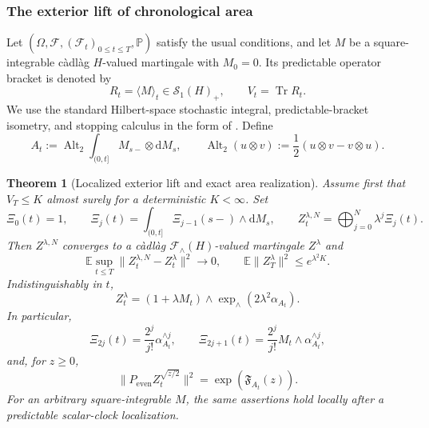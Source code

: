 \documentclass[10pt,reqno]{amsart}
\theoremstyle{plain}
\newtheorem{theorem}{Theorem}[section]
\theoremstyle{definition}
\theoremstyle{remark}
\begin{document}
\subsubsection{The exterior lift of chronological area}

Let \((\Omega,\mathcal F,(\mathcal F_t)_{0\leq t\leq T},\mathbb P)\)
satisfy the usual conditions, and let \(M\) be a square-integrable
c\`adl\`ag \(H\)-valued martingale with \(M_0=0\).  Its predictable
operator bracket is denoted by
\[
 R_t=\langle M\rangle_t\in\mathcal S_1(H)_+,
 \qquad V_t=\operatorname{Tr}R_t.
\]
We use the standard Hilbert-space stochastic integral, predictable-bracket
isometry, and stopping calculus in the form of
\cite{MetivierPellaumail80}.
Define
\begin{equation}
 A_t:=\operatorname{Alt}_2
       \int_{(0,t]}M_{s-}\otimes\mathrm dM_s,
 \qquad
 \operatorname{Alt}_2(u\otimes v)
 :=\frac12(u\otimes v-v\otimes u).
 \label{cc:eq-chronological-area}
\end{equation}

\begin{theorem}[Localized exterior lift and exact area realization]
\label{cc:thm-localized-exterior-lift}
Assume first that \(V_T\leq K\) almost surely for a deterministic
\(K<\infty\).  Set
\begin{equation}
 \Xi_0(t)=1,
 \qquad
 \Xi_j(t)=\int_{(0,t]}\Xi_{j-1}(s-)\wedge\mathrm dM_s,
 \qquad
 Z_t^{\lambda,N}=\bigoplus_{j=0}^N\lambda^j\Xi_j(t).
 \label{cc:eq-exterior-iterates}
\end{equation}
Then \(Z^{\lambda,N}\) converges to a c\`adl\`ag
\(\mathcal F_{\wedge}(H)\)-valued martingale \(Z^\lambda\) and
\begin{equation}
 \mathbb E\sup_{t\leq T}
 \|Z_t^{\lambda,N}-Z_t^\lambda\|^2\longrightarrow0,
 \qquad
 \mathbb E\|Z_T^\lambda\|^2\leq e^{\lambda^2K}.
 \label{cc:eq-exterior-energy}
\end{equation}
Indistinguishably in \(t\),
\begin{equation}
 Z_t^\lambda=(1+\lambda M_t)\wedge
 \exp_{\wedge}(2\lambda^2\alpha_{A_t}).
 \label{cc:eq-exact-exterior-area}
\end{equation}
In particular,
\begin{equation}
 \Xi_{2j}(t)=\frac{2^j}{j!}\alpha_{A_t}^{\wedge j},
 \qquad
 \Xi_{2j+1}(t)=\frac{2^j}{j!}
 M_t\wedge\alpha_{A_t}^{\wedge j},
 \label{cc:eq-exterior-level-formulas}
\end{equation}
and, for \(z\geq0\),
\begin{equation}
 \|P_{\mathrm{even}}Z_t^{\sqrt{z/2}}\|^2
 =\exp(\mathfrak F_{A_t}(z)).
 \label{cc:eq-even-profile-identity}
\end{equation}
For an arbitrary square-integrable \(M\), the same assertions hold locally
after a predictable scalar-clock localization.
\end{theorem}
\end{document}

